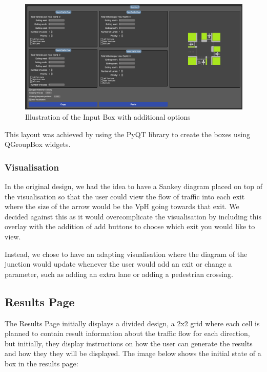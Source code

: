 \documentclass{article}
\begin{document}
        \begin{figure}[H]
            \centering
            \includegraphics[width=\textwidth]{inputExtra.png}
            \caption{Illustration of the Input Box with additional options}
            \label{fig:inputBox}
        \end{figure}

        This layout was achieved by using the PyQT library to create the boxes using QGroupBox widgets.
    \subsubsection{Visualisation}
    In the original design, we had the idea to have a Sankey diagram placed on top of the visualisation so that the user could view the flow of traffic into each exit where the size of the arrow would be the VpH going towards that exit. We decided against this as it would overcomplicate the visualisation by including this overlay with the addition of add buttons to choose which exit you would like to view. 

    Instead, we chose to have an adapting visualisation where the diagram of the junction would update whenever the user would add an exit or change a parameter, such as adding an extra lane or adding a pedestrian crossing.
    \subsection{Results Page}
        
        The Results Page initially displays a divided design, a 2x2 grid where each cell is planned to contain result information about the traffic flow for each direction, but initially,
        they display instructions on how the user can generate the results and how they they will be displayed. The image below shows the initial state of a box in the results page:
\end{document}
